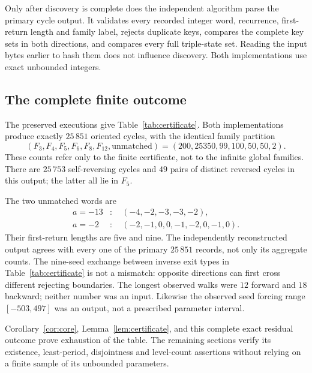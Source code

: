 Only after discovery is complete does the independent algorithm
parse the primary cycle output. It validates every recorded
integer word, recurrence, first-return length and family label,
rejects duplicate keys, compares the complete key sets in both
directions, and compares every full triple-state set. Reading
the input bytes earlier to hash them does not influence discovery.
Both implementations use exact unbounded integers.

\subsection{The complete finite outcome}
The preserved executions give Table~\ref{tab:certificate}.
Both implementations produce exactly $25\,851$ oriented cycles,
with the identical family partition
\begin{equation}
 (F_3,F_4,F_5,F_6,F_8,F_{12},\text{unmatched})
 =(200,25350,99,100,50,50,2).
 \label{eq:familypartition}
\end{equation}
These counts refer only to the finite certificate, not to the
infinite global families. There are $25\,753$ self-reversing
cycles and $49$ pairs of distinct reversed cycles in this output;
the latter all lie in $F_5$.


The two unmatched words are
\begin{align*}
 a=-13 &: \quad (-4,-2,-3,-3,-2),\\
 a=-2 &: \quad (-2,-1,0,0,-1,-2,0,-1,0).
\end{align*}
Their first-return lengths are five and nine. The independently
reconstructed output agrees with every one of the primary
$25\,851$ records, not only its aggregate counts. The nine-seed
exchange between inverse exit types in
Table~\ref{tab:certificate} is not a mismatch: opposite
directions can first cross different rejecting boundaries.
The longest observed walks were $12$ forward and $18$ backward;
neither number was an input. Likewise the observed seed forcing
range $[-503,497]$ was an output, not a prescribed parameter
interval.

Corollary~\ref{cor:core}, Lemma~\ref{lem:certificate}, and
this complete exact residual outcome prove exhaustion of the
table. The remaining sections verify its existence, least-period,
disjointness and level-count assertions without relying on a
finite sample of its unbounded parameters.
